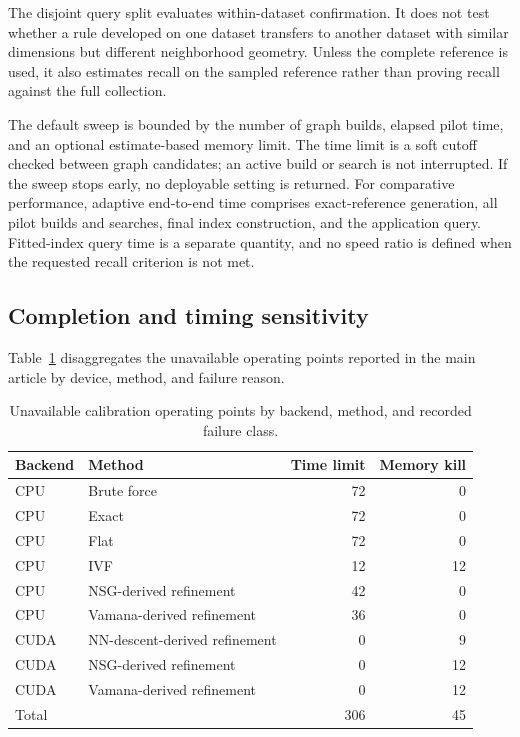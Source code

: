 \documentclass[11pt]{article}
\begin{document}
The disjoint query split evaluates within-dataset confirmation. It does not
test whether a rule developed on one dataset transfers to another dataset with
similar dimensions but different neighborhood geometry. Unless the complete
reference is used, it also estimates recall on the sampled reference rather
than proving recall against the full collection.

The default sweep is bounded by the number of graph builds, elapsed pilot
time, and an optional estimate-based memory limit. The time limit is a soft
cutoff checked between graph candidates; an active build or search is not
interrupted. If the sweep stops early, no deployable setting is returned. For
comparative performance, adaptive end-to-end time comprises
exact-reference generation, all pilot builds and searches, final index
construction, and the application query. Fitted-index query time is a separate
quantity, and no speed ratio is defined when the requested recall criterion is
not met.

\subsection{Completion and timing sensitivity}

Table~\ref{tab:calibration-missing} disaggregates the unavailable operating
points reported in the main article by device, method, and failure reason.

\begin{table}[h]
\centering

\begin{tabular}{@{}llrr@{}}
\toprule
Backend & Method & Time limit & Memory kill \\
\midrule
CPU & Brute force & 72 & 0 \\
CPU & Exact & 72 & 0 \\
CPU & Flat & 72 & 0 \\
CPU & IVF & 12 & 12 \\
CPU & NSG-derived refinement & 42 & 0 \\
CPU & Vamana-derived refinement & 36 & 0 \\
CUDA & NN-descent-derived refinement & 0 & 9 \\
CUDA & NSG-derived refinement & 0 & 12 \\
CUDA & Vamana-derived refinement & 0 & 12 \\
\midrule
Total & & 306 & 45 \\
\bottomrule
\end{tabular}
\caption{Unavailable calibration operating points by backend, method, and
recorded failure class.}
\label{tab:calibration-missing}
\end{table}
\end{document}
